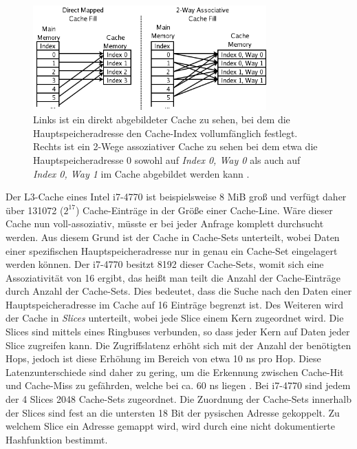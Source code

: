 \begin{figure}[h]
\label{fig:CacheAsso}
\centering
\includegraphics[width=0.8\textwidth]{basics/Cache_Asso.png}
\caption{Links ist ein direkt abgebildeter Cache zu sehen, bei dem die Hauptspeicheradresse den Cache-Index vollumfänglich festlegt. Rechts ist ein 2-Wege assoziativer Cache zu sehen bei dem etwa die Hauptspeicheradresse 0 sowohl auf \textit{Index 0, Way 0} als auch auf \textit{Index 0, Way 1} im Cache abgebildet werden kann \cite{CacheAssoWiki}.}
\end{figure}

\newtextend

Der L3-Cache eines Intel i7-4770 ist beispielsweise 8 MiB groß und verfügt daher über 131072 ($2^{17}$) Cache-Einträge in der Größe einer Cache-Line. 
Wäre dieser Cache nun voll-assoziativ, müsste er bei jeder Anfrage komplett durchsucht werden. Aus diesem Grund ist der Cache in Cache-Sets unterteilt, wobei Daten einer spezifischen Hauptspeicheradresse nur in genau ein Cache-Set eingelagert werden können. 
Der i7-4770 besitzt 8192 dieser Cache-Sets, womit sich eine Assoziativität von 16 ergibt, das heißt man teilt die Anzahl der Cache-Einträge durch Anzahl der Cache-Sets. Dies bedeutet, dass die Suche nach den Daten einer Hauptspeicheradresse im Cache auf 16 Einträge begrenzt ist. 
Des Weiteren wird der Cache in \textit{Slices} unterteilt, wobei jede Slice einem Kern zugeordnet wird. Die Slices sind mittels eines Ringbuses verbunden, so dass jeder Kern auf Daten jeder Slice zugreifen kann. Die Zugriffslatenz erhöht sich mit der Anzahl der benötigten Hops, jedoch ist diese Erhöhung im Bereich von etwa 10 ns pro Hop. Diese Latenzunterschiede sind daher zu gering, um die Erkennung zwischen Cache-Hit und Cache-Miss zu gefährden, welche bei ca. 60 ns liegen \cite{TheSpyInTheSandbox}. Bei i7-4770 sind jedem der 4 Slices 2048 Cache-Sets zugeordnet. Die Zuordnung der Cache-Sets innerhalb der Slices sind fest an die untersten 18 Bit der pysischen Adresse gekoppelt. Zu welchem Slice ein Adresse gemappt wird, wird durch eine nicht dokumentierte Hashfunktion bestimmt.

